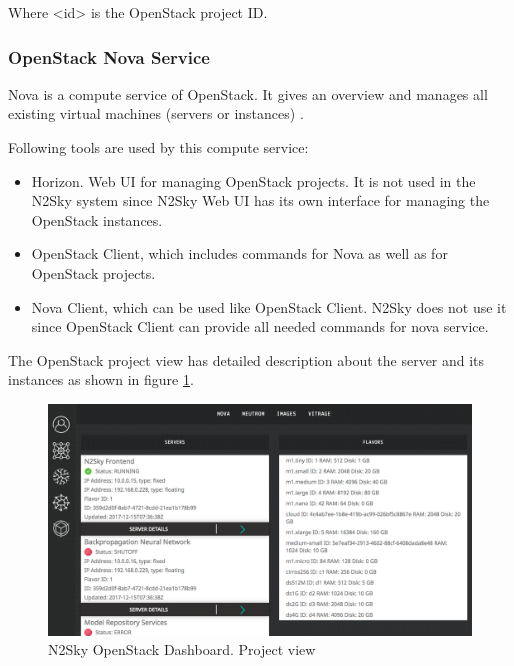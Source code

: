 Where <id> is the OpenStack project ID.

\subsubsection{OpenStack Nova Service}\label{OpenStack Nova Service}

Nova is a compute service of OpenStack. It gives an overview and manages all existing virtual machines (servers or instances) \cite{Markelov2016}. 

Following tools are used by this compute service:
\begin{itemize}
\item Horizon. Web UI for managing OpenStack projects. It is not used in the N2Sky system since N2Sky Web UI has its own interface for managing the OpenStack instances.
\item OpenStack Client, which includes commands for Nova as well as for OpenStack projects.
\item Nova Client, which can be used like OpenStack Client. N2Sky does not use it since OpenStack Client can provide all needed commands for nova service. 
\end{itemize}


The OpenStack project view has detailed description about the server and its instances as shown in figure \ref{fig:openstack_project_view}. 

\begin{figure}[H]
\begin{center}
  \includegraphics[width=\linewidth]{components/4/pics/openstack_project_view.png}
  \caption{N2Sky OpenStack Dashboard. Project view}
  \label{fig:openstack_project_view}
\end{center}
\end{figure}

